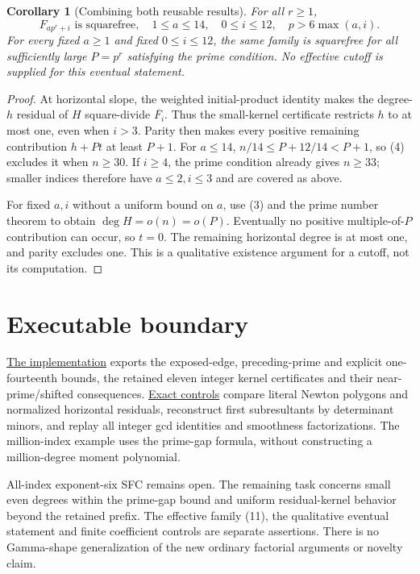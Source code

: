 \documentclass[11pt]{article}
\newtheorem{corollary}[theorem]{Corollary}
\begin{document}
\begin{corollary}[Combining both reusable results]\label{cor:rectangle}
For all $r\ge1$,
\[
 \boxed{F_{ap^r+i}\text{ is squarefree},\quad
 1\le a\le14,\quad0\le i\le12,\quad p>6\max(a,i).} \tag{11}
\]
For every fixed $a\ge1$ and fixed $0\le i\le12$, the same family
is squarefree for all sufficiently large $P=p^r$ satisfying the prime
condition. No effective cutoff is supplied for this eventual statement.
\end{corollary}
\begin{proof}
At horizontal slope, the weighted initial-product identity makes the
degree-$h$ residual of $H$ square-divide $\overline{F_i}$. Thus the
small-kernel certificate restricts $h$ to at most one, even when $i>3$. Parity then makes every positive
remaining contribution $h+Pt$ at least $P+1$.
For $a\le14$, $n/14\le P+12/14<P+1$, so (4) excludes it when
$n\ge30$. If $i\ge4$, the prime condition already gives $n\ge33$;
smaller indices therefore have $a\le2,i\le3$ and are covered as above.

For fixed $a,i$ without a uniform bound on $a$, use (3) and the
prime number theorem to obtain $\deg H=o(n)=o(P)$. Eventually no
positive multiple-of-$P$ contribution can occur, so $t=0$. The
remaining horizontal degree is at most one, and parity excludes one.
This is a qualitative existence argument for a cutoff, not its computation.
\end{proof}

\section{Executable boundary}
\href{prime_gap_windows.py}{The implementation} exports the exposed-edge,
preceding-prime and explicit one-fourteenth bounds, the retained eleven
integer kernel certificates and their near-prime/shifted consequences.
\href{verify_prime_gap_windows.py}{Exact controls} compare literal Newton
polygons and normalized horizontal residuals, reconstruct first
subresultants by determinant minors, and replay all integer gcd identities
and smoothness factorizations. The million-index example uses the prime-gap
formula, without constructing a million-degree moment polynomial.

All-index exponent-six SFC remains open. The remaining task concerns
small even degrees within the prime-gap bound and uniform residual-kernel
behavior beyond the retained prefix. The effective family (11), the
qualitative eventual statement and finite coefficient controls are
separate assertions. There is no Gamma-shape generalization of the new
ordinary factorial arguments or novelty claim.
\end{document}
